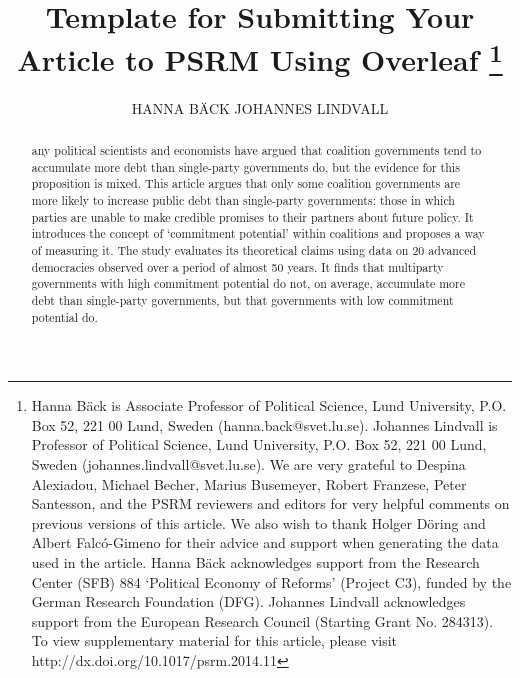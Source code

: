 \documentclass{cup_PSRM}
\begin{document}



\title{Template for Submitting Your Article to PSRM Using Overleaf
%
\thanks{Hanna Bäck is
Associate Professor of Political Science, Lund University, P.O. Box
52, 221 00 Lund, Sweden (hanna.back@svet.lu.se). Johannes Lindvall
is Professor of Political Science, Lund University, P.O. Box 52, 221
00 Lund, Sweden (johannes.lindvall@svet.lu.se). We are very grateful
to Despina Alexiadou, Michael Becher, Marius Busemeyer, Robert
Franzese, Peter Santesson, and the PSRM reviewers and editors for
very helpful comments on previous versions of this article. We also
wish to thank Holger Döring and Albert Falcó-Gimeno for their
advice and support when generating the data used in the article.
Hanna Bäck acknowledges support from the Research Center (SFB) 884
`Political Economy of Reforms' (Project C3), funded by the German
Research Foundation (DFG). Johannes Lindvall acknowledges support
from the European Research Council (Starting Grant No. 284313). To
view supplementary material for this article, please visit
http://dx.doi.org/10.1017/psrm.2014.11}}

\author{HANNA BÄCK \AND JOHANNES LINDVALL}

\maketitle

\begin{abstract}
any political scientists and economists have argued that coalition governments tend
to accumulate more debt than single-party governments do, but the evidence for this
proposition is mixed. This article argues that only some coalition governments are
more likely to increase public debt than single-party governments: those in which parties are
unable to make credible promises to their partners about future policy. It introduces the concept
of `commitment potential' within coalitions and proposes a way of measuring it. The study
evaluates its theoretical claims using data on 20 advanced democracies observed over a period
of almost 50 years. It finds that multiparty governments with high commitment potential do not,
on average, accumulate more debt than single-party governments, but that governments with
low commitment potential do.
\end{abstract}
\end{document}

